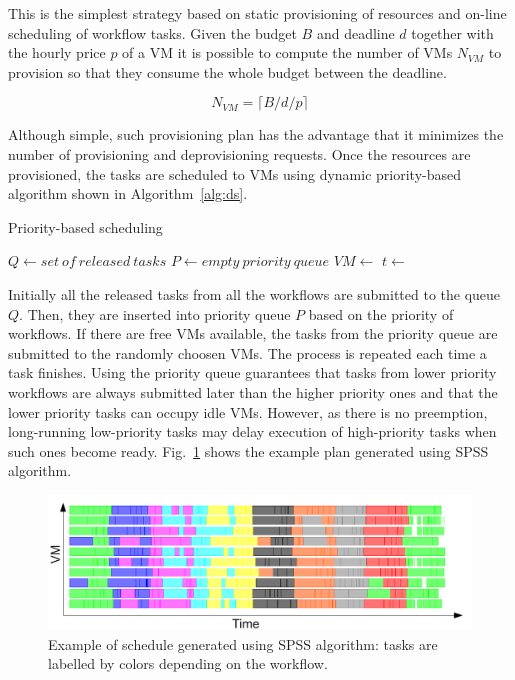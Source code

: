 \documentclass{sig-alternate}
\begin{document}
This is the simplest strategy based on static provisioning of resources and
on-line scheduling of workflow tasks. Given the budget $B$ and deadline $d$
together with the hourly price $p$ of a VM it is possible to compute the number
of VMs $N_{VM}$ to provision so that they consume the whole budget between the
deadline. 

\begin{equation}
\label{eq:static-plan}
N_{VM} = \lceil B / d / p \rceil
\end{equation}

Although simple, such provisioning plan has the advantage that it
minimizes the number of provisioning and deprovisioning requests.
Once the resources are provisioned, the tasks are scheduled to VMs using dynamic
priority-based algorithm shown in Algorithm~\ref{alg:ds}. 

\begin{algorithm}
\caption{Priority-based scheduling}
\label{alg:ds}
\begin{algorithmic}[1]
    \State $Q\gets set\ of\ released\ tasks$
    \State $P\gets empty\ priority\ queue$
    		\State {} 
    	\EndFor
    		\State $VM\gets$ 
    		\State $t\gets$ 
    		\State {}
    	\EndWhile
    	\State {}
    	\State {}
    \EndWhile
\EndProcedure
\end{algorithmic} 
\end{algorithm}

Initially all the
released tasks from all the workflows are submitted to the queue $Q$. Then, they
are inserted into priority queue $P$ based on the priority of workflows. If
there are free VMs available, the tasks from the priority queue are submitted to
the randomly choosen VMs. The process is repeated each time a task finishes.
Using the priority queue guarantees that tasks from lower priority workflows are
always submitted later than the higher priority ones and that the lower priority
tasks can occupy idle VMs. However, as there is no preemption, long-running
low-priority tasks may delay execution of high-priority tasks when such ones
become ready. Fig.~\ref{fig:spss-example} shows the example plan generated using
SPSS algorithm.

\begin{figure}[htb] 
\centering
\includegraphics[width=1.0\columnwidth]{figures/spds-gantt}
 \caption{Example of schedule generated using SPSS algorithm: tasks are labelled
 by colors depending on the workflow. }
\label{fig:spss-example}
\end{figure}
\end{document}

